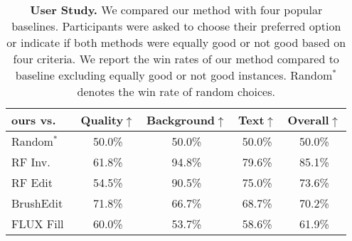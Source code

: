 \begin{table}[t]
    \centering
    \small
    \setlength{\tabcolsep}{1.73mm}
        \begin{tabular}{l|ccc|c}
            \toprule

            \multicolumn{1}{l|}{\textbf{ours vs.}} & Quality$\uparrow$ & Background$\uparrow$ &\multicolumn{1}{c|}{Text$\uparrow$}& Overall$\uparrow$\\
            \midrule
            Random$^{*}$ &50.0\% & 50.0\% &50.0\% &50.0\%\\
            \midrule
            RF Inv.~\cite{rout2024semantic}&61.8\% &94.8\% &79.6\% &85.1\%\\
            RF Edit~\cite{wang2024taming}&54.5\% &90.5\% &75.0\% &73.6\%\\
            BrushEdit~\cite{li2024brushedit}&71.8\% & 66.7\% &68.7\% &70.2\%\\
            FLUX Fill~\cite{flux}&60.0\% & 53.7\% &58.6\% &61.9\%\\
            \bottomrule
        \end{tabular}
    \caption{\textbf{User Study.} We compared our method with four popular baselines. Participants were asked to choose their preferred option or indicate if both methods were equally good or not good based on four criteria. We report the win rates of our method compared to baseline excluding equally good or not good instances. Random$^{*}$ denotes the win rate of random choices.}
    \label{tab:user_study}
    \vspace{-10pt}
\end{table}
    
